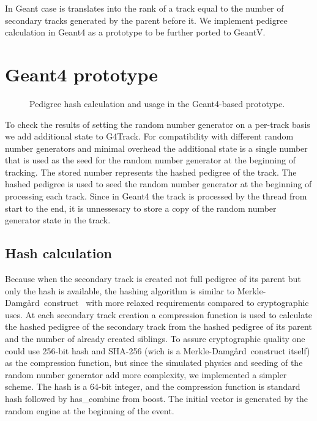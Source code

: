 \documentclass[a4paper, titlepage, 12pt]{article} %
\newcommand{\MD}{Merkle-Damg\r{a}rd}
\begin{document}
   In Geant case is translates into the rank of a track equal to the number of secondary tracks generated by the parent before it.
   We implement pedigree calculation in Geant4 as a prototype to be further ported to GeantV.
   
  
 \section{Geant4 prototype}
  \begin{figure}
   \scalebox{.5}{}
   \caption{Pedigree hash calculation and usage in the Geant4-based prototype.}
  \end{figure}
  To check the results of setting the random number generator on a per-track basis we add additional state to G4Track.
  For compatibility with different random number generators and minimal overhead the additional state is a single number that is used as the seed for the random number generator at the beginning of tracking.
  The stored number represents the hashed pedigree of the track.
  The hashed pedigree is used to seed the random number generator at the beginning of processing each track.
  Since in Geant4 the track is processed by the thread from start to the end, it is unnessesary to store a copy of the random number generator state in the track.
 
  \subsection{Hash calculation}
   Because when the secondary track is created not full pedigree of its parent but only the hash is available, the hashing algorithm is similar to \MD\ construct~\cite{Damgard1990, Merkle1990} with more relaxed requirements compared to cryptographic uses.
   At each secondary track creation a compression function is used to calculate the hashed pedigree of the secondary track from the hashed pedigree of its parent and the number of already created siblings.
   To assure cryptographic quality one could use 256-bit hash and SHA-256 (wich is a \MD\ construct itself) as the compression function, but since the simulated physics and seeding of the random number generator add more complexity, we implemented a simpler scheme.
   The hash is a 64-bit integer, and the compression function is standard hash followed by has\_combine from boost.
   The initial vector is generated by the random engine at the beginning of the event.
 
\end{document}
